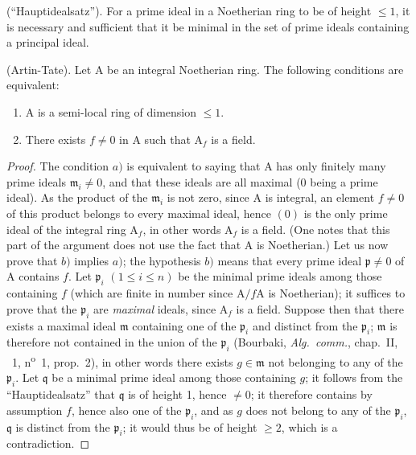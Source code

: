\begin{corollary}[16.3.2]
\label{0.16.3.2}
\textup{(``Hauptidealsatz'').}
For a prime ideal in a Noetherian ring to be of height $\leq 1$, it is necessary and sufficient that it be minimal in the set of prime ideals containing a principal ideal.
\end{corollary}

\begin{corollary}[16.3.3]
\label{0.16.3.3}
\textup{(Artin-Tate).}
Let $\mathrm{A}$ be an integral Noetherian ring.
The following conditions are equivalent:
\begin{enumerate}
  \item[a)] $\mathrm{A}$ is a semi-local ring of dimension $\leq 1$.
  \item[b)] There exists $f\neq 0$ in $\mathrm{A}$ such that $\mathrm{A}_f$ is a field.
\end{enumerate}
\end{corollary}

\begin{proof}
The condition $a)$ is equivalent to saying that $\mathrm{A}$ has only finitely many prime ideals $\mathfrak{m}_i\neq 0$, and that these ideals are all maximal (0 being a prime ideal).
As the product of the $\mathfrak{m}_i$ is not zero, since $\mathrm{A}$ is integral, an element $f\neq 0$ of this product belongs to every maximal ideal, hence $(0)$ is the only prime ideal of the integral ring $\mathrm{A}_f$, in other words $\mathrm{A}_f$ is a field.
(One notes that this part of the argument does not use the fact that $\mathrm{A}$ is Noetherian.)
Let us now prove that $b)$ implies $a)$; the hypothesis $b)$ means that every prime ideal $\mathfrak{p}\neq 0$ of $\mathrm{A}$ contains $f$.
Let $\mathfrak{p}_i$ $(1\leq i\leq n)$ be the minimal prime ideals among those containing $f$ (which are finite in number since $\mathrm{A}/f\mathrm{A}$ is Noetherian); it suffices to prove that the $\mathfrak{p}_i$ are \emph{maximal} ideals, since $\mathrm{A}_f$ is a field.
Suppose then that there exists a maximal ideal $\mathfrak{m}$ containing one of the $\mathfrak{p}_i$ and distinct from the $\mathfrak{p}_i$; $\mathfrak{m}$ is therefore not contained in the union of the $\mathfrak{p}_i$ (Bourbaki, \emph{Alg.~comm.}, chap.~II, \textsection~1, n\textsuperscript{o}~1, prop.~2), in other words there exists $g\in\mathfrak{m}$ not belonging to any of the $\mathfrak{p}_i$.
Let $\mathfrak{q}$ be a minimal prime ideal among those containing $g$; it follows from the ``Hauptidealsatz''  that $\mathfrak{q}$ is of height 1, hence $\neq 0$; it therefore contains by assumption $f$, hence also one of the $\mathfrak{p}_i$, and as $g$ does not belong to any of the $\mathfrak{p}_i$, $\mathfrak{q}$ is distinct from the $\mathfrak{p}_i$; it would thus be of height $\geq 2$, which is a contradiction.
\end{proof}

